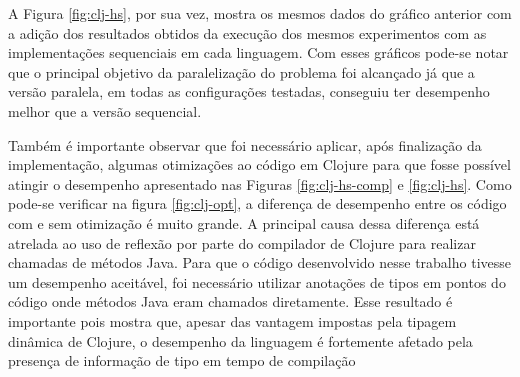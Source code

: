 A Figura \ref{fig:clj-hs}, por sua vez, mostra os mesmos dados do gráfico anterior com a adição dos resultados obtidos da execução dos mesmos experimentos com as implementações sequenciais em cada linguagem. Com esses gráficos pode-se notar que o principal objetivo da paralelização do problema foi alcançado já que a versão paralela, em todas as configurações testadas, conseguiu ter desempenho melhor que a versão sequencial.

Também é importante observar que foi necessário aplicar, após finalização da implementação, algumas otimizações ao código em Clojure para que fosse possível atingir o desempenho apresentado nas Figuras \ref{fig:clj-hs-comp} e \ref{fig:clj-hs}. Como pode-se verificar na figura \ref{fig:clj-opt}, a diferença de desempenho entre os código com e sem otimização é muito grande. A principal causa dessa diferença está atrelada ao uso de reflexão por parte do compilador de Clojure para realizar chamadas de métodos Java. Para que o código desenvolvido nesse trabalho tivesse um desempenho aceitável, foi necessário utilizar anotações de tipos em pontos do código onde métodos Java eram chamados diretamente. Esse resultado é importante pois mostra que, apesar das vantagem impostas pela tipagem dinâmica de Clojure, o desempenho da linguagem é fortemente afetado pela presença de informação de tipo em tempo de compilação

